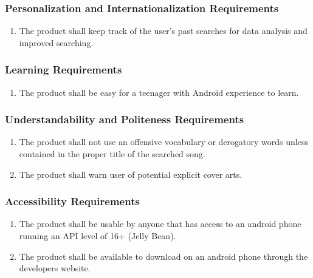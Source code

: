 \documentclass[]{article}
\newcounter{saveenum}
\newcommand{\pauseEnum}{\setcounter{saveenum}{\value{enumi}}}
\newcommand{\resumeEnum}{\setcounter{enumi}{\value{saveenum}}}
\begin{document}
\subsubsection{Personalization and Internationalization Requirements}
\label{ssub:personalization_and_internationalization_requirements}
\begin{enumerate}[{UH}1. ]
	\resumeEnum
	\item The product shall keep  track of the user's past searches for data analysis and improved searching.
	\pauseEnum
\end{enumerate}

\subsubsection{Learning Requirements}
\label{ssub:learning_requirements}
\begin{enumerate}[{UH}1. ]
	\resumeEnum
	\item The product shall be easy for a teenager with Android experience to learn.
	\pauseEnum
\end{enumerate}

\subsubsection{Understandability and Politeness Requirements}
\label{ssub:understandability_and_politeness_requirements}
\begin{enumerate}[{UH}1. ]
	\resumeEnum
	\item The product shall not use an offensive vocabulary or derogatory words unless contained in the proper title of the searched song.
	\item The product shall warn user of potential explicit cover arts.
	\pauseEnum
\end{enumerate}

\subsubsection{Accessibility Requirements}
\label{ssub:accessibility_requirements}
\begin{enumerate}[{UH}1. ]
	\resumeEnum
	\item The product shall be usable by anyone that has access to an android phone running an API level of 16+ (Jelly Bean).
	\item The product shall be available to download on an android phone through the developers website.
	\pauseEnum
\end{enumerate}
\end{document}
